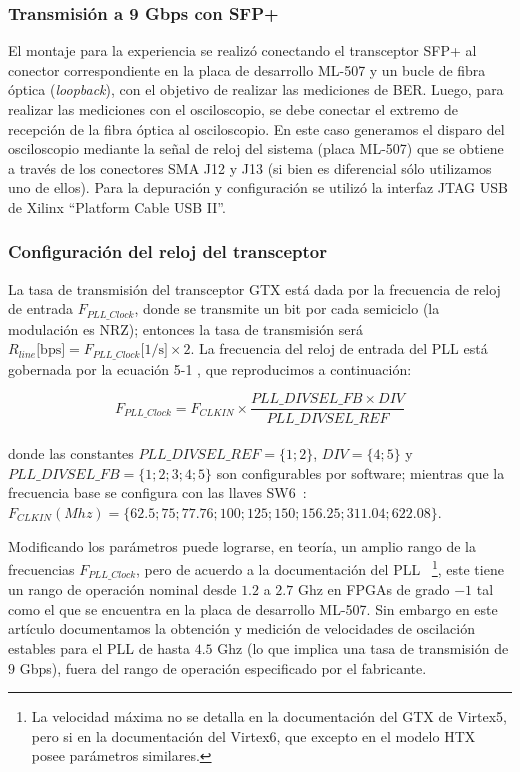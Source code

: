 \documentclass[a4paper,10pt]{report}
\begin{document}
\subsubsection{Transmisión a 9 Gbps con SFP+}
El montaje para la experiencia se realizó conectando el transceptor SFP+
al conector correspondiente en la placa de desarrollo ML-507 y un bucle de
fibra óptica ({\em loopback}), con el objetivo de realizar las
mediciones de BER. Luego, para realizar las mediciones con el
osciloscopio, se debe conectar el extremo de recepción de la fibra
óptica al osciloscopio. En este caso generamos el disparo del
osciloscopio mediante la señal de reloj del sistema (placa ML-507) que
se obtiene a través de los conectores SMA J12 y J13 (si bien es
diferencial sólo utilizamos uno de ellos).  Para la depuración y
configuración se utilizó la interfaz JTAG USB de Xilinx ``Platform Cable
USB II''.
\subsubsection{Configuración del reloj del transceptor}

La tasa de transmisión del transceptor GTX está dada por la
frecuencia de reloj de entrada $F_{PLL\_Clock}$, donde se transmite un
bit por cada semiciclo (la modulación es NRZ); entonces la tasa de
transmisión será
$R_{line}\mbox{[bps]}=F_{PLL\_Clock}\mbox{[1/s]} \times 2$.  La
frecuencia del reloj de entrada del PLL está gobernada por la ecuación
5-1 \cite[Pag. 88]{ug198}, que reproducimos a continuación:

\begin{equation}
F_{PLL\_Clock} = F_{CLKIN} \times \frac{PLL\_DIVSEL\_FB \times
DIV}{PLL\_DIVSEL\_REF}%
\end{equation}\\

donde las constantes $PLL\_DIVSEL\_REF = \{1;2\}$, $DIV = \{4;5\} $ y
$PLL\_DIVSEL\_FB = \{1;2;3;4;5\}$ son configurables por software;
mientras que la frecuencia base se configura con las llaves
SW6~\cite[Tabla 1-32]{ug347}: $
F_{CLKIN} (Mhz)= \{62.5;75;77.76;100;125;150;156.25;311.04;622.08\}$.


 Modificando los parámetros puede lograrse, en teoría, un amplio rango
de la frecuencias $F_{PLL\_Clock}$, pero de acuerdo a la documentación
del PLL \cite[Pág. 71]{ug366}~\footnote{La velocidad máxima no se
detalla en la documentación del GTX de Virtex5, pero si en la
documentación del Virtex6, que excepto en el modelo HTX posee parámetros
similares.}, este tiene un rango de operación nominal desde $1.2$ a
$2.7$ Ghz en FPGAs de grado $-1$ tal como el que se encuentra en la
placa de desarrollo ML-507. Sin embargo en este artículo documentamos la
obtención y medición de velocidades de oscilación estables para el PLL
de hasta $4.5$ Ghz (lo que implica una tasa de transmisión de $9$ Gbps),
fuera del rango de operación especificado por el fabricante.
\end{document}

